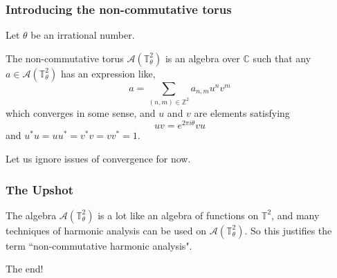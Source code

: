 \documentclass{beamer}
\newcommand{\Cplx}{\mathbb{C}}
\newcommand{\Circ}{\mathbb{T}}
\newcommand{\Itgr}{\mathbb{Z}}
\begin{document}
\begin{frame}
    \frametitle{Introducing the non-commutative torus}
    Let $\theta$ be an irrational number.
    \begin{definition}
        The non-commutative torus $\mathcal{A}(\Circ^2_\theta)$
        is an algebra over $\Cplx$ such that any $a \in \mathcal{A}(\Circ^2_\theta)$
        has an expression like,
        \begin{equation*}
            a = \sum_{(n,m) \in \Itgr^2} a_{n,m} u^nv^m
        \end{equation*}
        which converges in some sense, and $u$ and $v$
        are elements satisfying
        \begin{equation*}
            uv = e^{2\pi i \theta} vu
        \end{equation*}
        and $u^*u = uu^* = v^*v = vv^* = 1$.
    \end{definition}
    Let us ignore issues of convergence for now. 
\end{frame}

\begin{frame}
    \frametitle{The Upshot}
    The algebra $\mathcal{A}(\Circ^2_\theta)$ is a lot
    like an algebra of functions on $\Circ^2$,
    and many techniques of harmonic analysis can be used
    on $\mathcal{A}(\Circ^2_\theta)$. So this
    justifies the term ``non-commutative harmonic analysis".
\end{frame}

\begin{frame}
    The end!
\end{frame}
\end{document}
